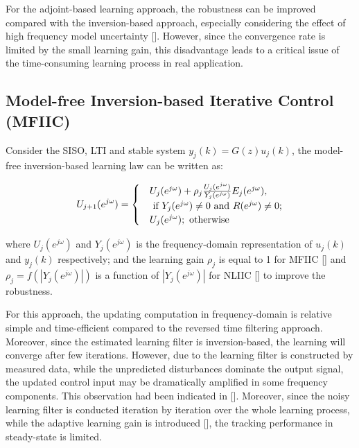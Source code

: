 For the adjoint-based learning approach, the robustness can be improved compared with the inversion-based approach, especially considering the effect of high frequency model uncertainty [\cite{owens2009robust}]. However, since the convergence rate is limited by the small learning gain, this disadvantage leads to a critical issue of the time-consuming learning process in real application.

\subsection{Model-free Inversion-based Iterative Control (MFIIC)}
\label{sec: Model-free Inversion-based Iterative Control (MFIIC)}

Consider the SISO, LTI and stable system $y_j(k)=G(z)u_j(k)$, the model-free inversion-based learning law can be written as: 

\begin{align}
U_{j+1}(e^{j\omega})=\begin{cases}
 & U_{j}(e^{j\omega})+\rho_j\frac{U_j(e^{j\omega})}{Y_j(e^{j\omega})}E_j(e^{j\omega}),\\ 
 &\text{ if } Y_j(e^{j\omega})\neq 0 $ and $ R(e^{j\omega})\neq 0 ;\\ 
 & U_{j}(e^{j\omega});\text{ otherwise}
\end{cases}
\end{align}

where $U_j(e^{j\omega})$ and $Y_j(e^{j\omega})$ is the frequency-domain representation of $u_j(k)$ and $y_j(k)$ respectively; and the learning gain $\rho_j$ is equal to 1 for MFIIC [\cite{kim2012modeling}] and $\rho_j=f(|Y_j(e^{j\omega})|)$ is a function of $|Y_j(e^{j\omega})|$ for NLIIC [\cite{de2019data}] to improve the robustness. 

For this approach, the updating computation in frequency-domain is relative simple and time-efficient compared to the reversed time filtering approach. Moreover, since the estimated learning filter is inversion-based, the learning will converge after few iterations. However, due to the learning filter is constructed by measured data, while the unpredicted disturbances dominate the output signal, the updated control input may be dramatically amplified in some frequency components. This observation had been indicated in [\cite{de2018improving}]. Moreover, since the noisy learning filter is conducted iteration by iteration over the whole learning process, while the adaptive learning gain is introduced [\cite{de2019data}], the tracking performance in steady-state is limited. 

